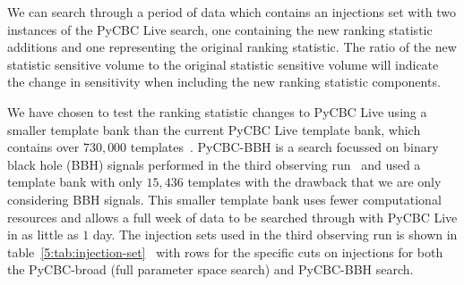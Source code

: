 We can search through a period of data which contains an injections set with two instances of the PyCBC Live search, one containing the new ranking statistic additions and one representing the original ranking statistic. The ratio of the new statistic sensitive volume to the original statistic sensitive volume will indicate the change in sensitivity when including the new ranking statistic components.

We have chosen to test the ranking statistic changes to PyCBC Live using a smaller template bank than the current PyCBC Live template bank, which contains over $730,000$ templates~\cite{PyCBC_Live:2018}. PyCBC-BBH is a search focussed on binary black hole (BBH) signals performed in the third observing run~\cite{PyCBC_focussed_bbh:2024} and used a template bank with only $15,436$ templates with the drawback that we are only considering BBH signals. This smaller template bank uses fewer computational resources and allows a full week of data to be searched through with PyCBC Live in as little as $1$ day. The injection sets used in the third observing run is shown in table~\ref{5:tab:injection-set}~\cite{gwtc3:2023} with rows for the specific cuts on injections for both the PyCBC-broad (full parameter space search) and PyCBC-BBH search.
